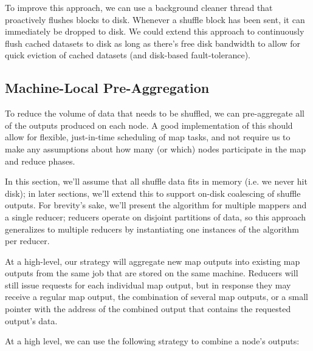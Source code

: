 \documentclass[12pt]{article}
\begin{document}
To improve this approach, we can use a background cleaner thread that
proactively flushes blocks to disk.  Whenever a shuffle block has been sent,
it can immediately be dropped to disk.  We could extend this approach to
continuously flush cached datasets to disk as long as there's free disk
bandwidth to allow for quick eviction of cached datasets (and disk-based
fault-tolerance).

\subsection{Machine-Local Pre-Aggregation}

To reduce the volume of data that needs to be shuffled, we can pre-aggregate
all of the outputs produced on each node.  A good implementation of this
should allow for flexible, just-in-time scheduling of map tasks, and not
require us to make any assumptions about how many (or which) nodes participate
in the map and reduce phases.

In this section, we'll assume that all shuffle data fits in memory (i.e. we
never hit disk); in later sections, we'll extend this to support on-disk
coalescing of shuffle outputs.  For brevity's sake, we'll present the
algorithm for multiple mappers and a single reducer; reducers operate on
disjoint partitions of data, so this approach generalizes to multiple reducers
by instantiating one instances of the algorithm per reducer.

At a high-level, our strategy will aggregate new map outputs into existing map
outputs from the same job that are stored on the same machine.  Reducers will
still issue requests for each individual map output, but in response they may
receive a regular map output, the combination of several map outputs, or a
small pointer with the address of the combined output that contains the
requested output's data.

At a high level, we can use the following strategy to combine a node's outputs:
\end{document}
